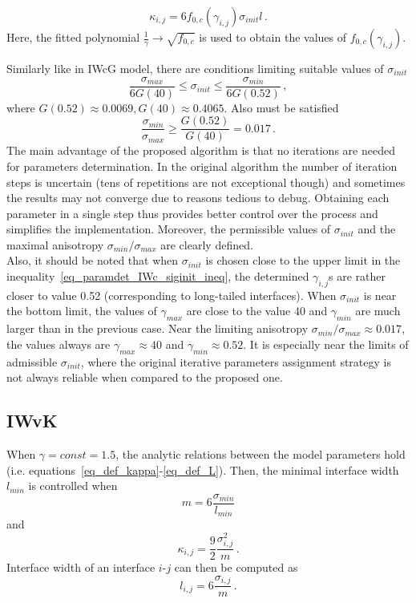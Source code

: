 \begin{equation}
	\kappa_{i,j}=6f_{0,c}(\gamma_{i,j})\sigma_{init}l \,.
\end{equation}
Here, the fitted polynomial $\frac{1}{\gamma} \rightarrow \sqrt{f_{0,c}}$ is used to obtain the values of $f_{0,c}(\gamma_{i,j})$.

Similarly like in IWcG model, there are conditions limiting suitable values of $\sigma_{init}$
\begin{equation} \label{eq_paramdet_IWc_siginit_ineq}
	\frac{\sigma_{max}}{6G(40)} \leq \sigma_{init} \leq \frac{\sigma_{min}}{6G(0.52)} \,,
\end{equation}
where $G(0.52)\approx0.0069, G(40)\approx0.4065$. Also must be satisfied
\begin{equation}
	\frac{\sigma_{min}}{\sigma_{max}} \geq\frac{G(0.52)}{G(40)} = 0.017 \,. 
\end{equation}
The main advantage of the proposed algorithm is that no iterations are needed for parameters determination. In the original algorithm the number of iteration steps is uncertain (tens of repetitions are not exceptional though) and sometimes the results may not converge due to reasons tedious to debug. Obtaining each parameter in a single step thus provides better control over the process and simplifies the implementation. Moreover, the permissible values of $\sigma_{init}$ and the maximal anisotropy $\sigma_{min}/\sigma_{max}$ are clearly defined. \\
Also, it should be noted that when $\sigma_{init}$ is chosen close to the upper limit in the inequality~\ref{eq_paramdet_IWc_siginit_ineq}, the determined $\gamma_{i,j}$s are rather closer to value 0.52 (corresponding to long-tailed interfaces). When $\sigma_{init}$ is near the bottom limit, the values of $\gamma_{max}$ are close to the value 40 and $\gamma_{min}$ are much larger than in the previous case. Near the limiting anisotropy $\sigma_{min}/\sigma_{max}\approx0.017$, the values always are $\gamma_{max}\approx40$ and $\gamma_{min}\approx0.52$. It is especially near the limits of admissible $\sigma_{init}$, where the original iterative parameters assignment strategy is not always reliable when compared to the proposed one.

\subsection{IWvK}
When $\gamma=const=1.5$, the analytic relations between the model parameters hold (i.e. equations~\eqref{eq_def_kappa}-\eqref{eq_def_L}). Then, the minimal interface width $l_{min}$ is controlled when
\begin{equation}
	m = 6\frac{\sigma_{min}}{l_{min}}
\end{equation}
and
\begin{equation}
	\kappa_{i,j}=\frac{9}{2}\frac{\sigma_{i,j}^2}{m} \,.
\end{equation}
Interface width of an interface $i$-$j$ can then be computed as
\begin{equation}
	l_{i,j} = 6\frac{\sigma_{i,j}}{m} \,.
\end{equation}

